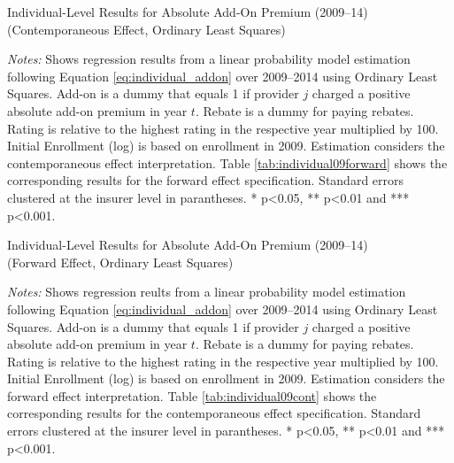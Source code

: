 \documentclass[a4paper, 11pt, english]{article}
\begin{document}
\begin{table}[ht]
	\captionsetup{justification=centering}
	\caption{Individual-Level Results for Absolute Add-On Premium (2009--14) \\ (Contemporaneous Effect, Ordinary Least Squares)}
	\label{tab:individual09cont}
	\begin{adjustbox}{width=\textwidth}
		
	\end{adjustbox}
	\begin{minipage}{\textwidth}
		\vspace{3pt}
		\footnotesize \textit{Notes:}
		Shows regression results from a linear probability model estimation following Equation \eqref{eq:individual_addon} over 2009--2014 using Ordinary Least Squares.
		Add-on is a dummy that equals 1 if provider $j$ charged a positive absolute add-on premium in year $t$. Rebate is a dummy for paying rebates. Rating is relative to the highest rating in the respective year multiplied by 100. Initial Enrollment (log) is based on enrollment in 2009.
		Estimation considers the contemporaneous effect interpretation. Table \ref{tab:individual09forward} shows the corresponding results for the forward effect specification.
		Standard errors clustered at the insurer level in parantheses. * p<0.05, **  p<0.01 and *** p<0.001. 
	\end{minipage}
\end{table}

\begin{table}[ht]
	\captionsetup{justification=centering}
	\caption{Individual-Level Results for Absolute Add-On Premium (2009--14) \\ (Forward Effect, Ordinary Least Squares)}
	\label{tab:individual09forward}
	\begin{adjustbox}{width=\textwidth}
		
	\end{adjustbox}
	\begin{minipage}{\textwidth}
		\vspace{3pt}
		\footnotesize \textit{Notes:} Shows regression reults from a linear probability model estimation following Equation \eqref{eq:individual_addon} over 2009--2014 using Ordinary Least Squares.
		Add-on is a dummy that equals 1 if provider $j$ charged a positive absolute add-on premium in year $t$. Rebate is a dummy for paying rebates. Rating is relative to the highest rating in the respective year multiplied by 100. Initial Enrollment (log) is based on enrollment in 2009.
		Estimation considers the forward effect interpretation. Table \ref{tab:individual09cont} shows the corresponding results for the contemporaneous effect specification.
		Standard errors clustered at the insurer level in parantheses. * p<0.05, **  p<0.01 and *** p<0.001. 
	\end{minipage}
\end{table}
\end{document}
